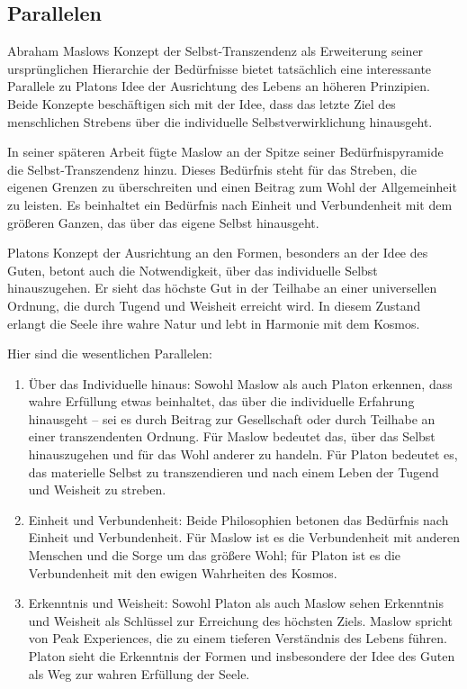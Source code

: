 \documentclass[12pt,a4paper]{article}
\begin{document}
\subsection[short]{Parallelen}
Abraham Maslows Konzept der Selbst-Transzendenz als Erweiterung seiner ursprünglichen Hierarchie der Bedürfnisse bietet tatsächlich eine interessante Parallele zu Platons Idee der Ausrichtung des Lebens an höheren Prinzipien. Beide Konzepte beschäftigen sich mit der Idee, dass das letzte Ziel des menschlichen Strebens über die individuelle Selbstverwirklichung hinausgeht.

In seiner späteren Arbeit fügte Maslow an der Spitze seiner Bedürfnispyramide die Selbst-Transzendenz hinzu. Dieses Bedürfnis steht für das Streben, die eigenen Grenzen zu überschreiten und einen Beitrag zum Wohl der Allgemeinheit zu leisten. Es beinhaltet ein Bedürfnis nach Einheit und Verbundenheit mit dem größeren Ganzen, das über das eigene Selbst hinausgeht.

Platons Konzept der Ausrichtung an den Formen, besonders an der Idee des Guten, betont auch die Notwendigkeit, über das individuelle Selbst hinauszugehen. Er sieht das höchste Gut in der Teilhabe an einer universellen Ordnung, die durch Tugend und Weisheit erreicht wird. In diesem Zustand erlangt die Seele ihre wahre Natur und lebt in Harmonie mit dem Kosmos.

Hier sind die wesentlichen Parallelen:

\begin{enumerate}
    \item 
 Über das Individuelle hinaus: Sowohl Maslow als auch Platon erkennen, dass wahre Erfüllung etwas beinhaltet, das über die individuelle Erfahrung hinausgeht – sei es durch Beitrag zur Gesellschaft oder durch Teilhabe an einer transzendenten Ordnung. Für Maslow bedeutet das, über das Selbst hinauszugehen und für das
 Wohl anderer zu handeln. Für Platon bedeutet es, das materielle Selbst
 zu transzendieren und nach einem Leben der Tugend und Weisheit zu
 streben.

 \item
Einheit und Verbundenheit: Beide Philosophien betonen das Bedürfnis nach Einheit und Verbundenheit. Für Maslow ist es die Verbundenheit mit anderen Menschen und die Sorge um das größere Wohl; für Platon ist es die Verbundenheit mit den ewigen Wahrheiten des Kosmos.

\item
Erkenntnis und Weisheit: Sowohl Platon als auch Maslow sehen Erkenntnis und Weisheit als Schlüssel zur Erreichung des höchsten Ziels. Maslow spricht von Peak Experiences, die zu einem tieferen Verständnis des Lebens führen. Platon sieht die Erkenntnis der Formen und insbesondere der Idee des Guten als Weg zur wahren Erfüllung der Seele.
\end{enumerate}
\end{document}
